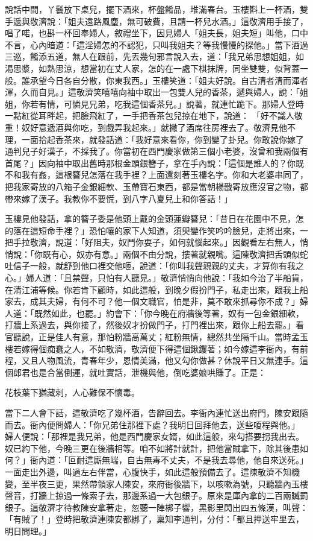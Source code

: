 說話中間，丫鬟放下桌兒，擺下酒來，杯盤餚品，堆滿春台。玉樓斟上一杯酒，雙手遞與敬濟說：「姐夫遠路風塵，無可破費，且請一杯兒水酒。」這敬濟用手接了，唱了喏，也斟一杯回奉婦人，敘禮坐下，因見婦人「姐夫長，姐夫短」叫他，口中不言，心內暗道：「這淫婦怎的不認犯，只叫我姐夫？等我慢慢的探他。」當下酒過三巡，餚添五道，無人在跟前，先丟幾句邪言說入去，道：「我兄弟思想姐姐，如渴思漿，如熱思涼，想當初在丈人家，怎的在一處下棋抹牌，同坐雙雙，似背蓋一般。誰承望今日各自分散，你東我西。」玉樓笑道：「姐夫好說。自古清者清而渾者渾，久而自見。」這敬濟笑嘻嘻向袖中取出一包雙人兒的香茶，遞與婦人，說：「姐姐，你若有情，可憐見兄弟，吃我這個香茶兒。」說著，就連忙跪下。那婦人登時一點紅從耳畔起，把臉飛紅了，一手把香茶包兒掠在地下，說道： 「好不識人敬重！奴好意遞酒與你吃，到戲弄我起來。」就撇了酒席往房裡去了。敬濟見他不理，一面拾起香茶來，就發話道：「我好意來看你，你到變了卦兒。你敢說你嫁了通判兒子好漢子，不採我了。你當初在西門慶家做第三個小老婆，沒曾和我兩個有首尾？」因向袖中取出舊時那根金頭銀簪子，拿在手內說：「這個是誰人的？你既不和我有姦，這根簪兒怎落在我手裡？上面還刻著玉樓名字。你和大老婆串同了，把我家寄放的八箱子金銀細軟、玉帶寶石東西，都是當朝楊戩寄放應沒官之物，都帶來嫁了漢子。我教你不要慌，到八字八夏兒上和你答話！」

玉樓見他發話，拿的簪子委是他頭上戴的金頭蓮瓣簪兒：「昔日在花園中不見，怎的落在這短命手裡？」恐怕嚷的家下人知道，須臾變作笑吟吟臉兒，走將出來，一把手拉敬濟，說道：「好阻夫，奴鬥你耍子，如何就惱起來。」因觀看左右無人，悄悄說：「你既有心，奴亦有意。」兩個不由分說，摟著就親嘴。這陳敬濟把舌頭似蛇吐信子一般，就舒到他口裡交他咂，說道：「你叫我聲親親的丈夫，才算你有我之心。」婦人道：「且禁聲，只怕有人聽見。」敬濟悄悄向他說：「我如今治了半船貨，在清江浦等候。你若肯下顧時，如此這般，到晚夕假扮門子，私走出來，跟我上船家去，成其夫婦，有何不可？他一個文職官，怕是非，莫不敢來抓尋你不成？」婦人道：「既然如此，也罷。」約會下：「你今晚在府牆後等著，奴有一包金銀細軟，打牆上系過去，與你接了，然後奴才扮做門子，打門裡出來，跟你上船去罷。」看官聽說，正是佳人有意，那怕粉牆高萬丈；紅粉無情，總然共坐隔千山。當時孟玉樓若嫁得個痴蠢之人，不如敬濟，敬濟便下得這個鍬钁著；如今嫁這李衙內，有前程，又且人物風流，青春年少，恩情美滿，他又勾你做甚？休說平日又無連手。這個郎君也是合當倒運，就吐實話，泄機與他，倒吃婆娘哄賺了。正是：

花枝葉下猶藏刺，人心難保不懷毒。

當下二人會下話，這敬濟吃了幾杯酒，告辭回去。李衙內連忙送出府門，陳安跟隨而去。衙內便問婦人：「你兄弟住那裡下處？我明日回拜他去，送些嗄程與他。」 婦人便說：「那裡是我兄弟，他是西門慶家女婿，如此這般，來勾搭要拐我出去。奴已約下他，今晚三更在後牆相等。咱不如將計就計，把他當賊拿下，除其後患如何？」衙內道：「叵耐這廝無端，自古無毒不丈夫，不是我去尋他，他自來送死。」一面走出外邊，叫過左右伴當，心腹快手，如此這般預備去了。這陳敬濟不知機變，至半夜三更，果然帶領家人陳安，來府衙後牆下，以咳嗽為號，只聽牆內玉樓聲音，打牆上掠過一條索子去，那邊系過一大包銀子。原來是庫內拿的二百兩贓罰銀子。這敬濟才待教陳安拿著走，忽聽一陣梆子響，黑影里閃出四五條漢，叫聲：「有賊了！」登時把敬濟連陳安都綁了，稟知李通判，分付：「都且押送牢里去，明日問理。」


